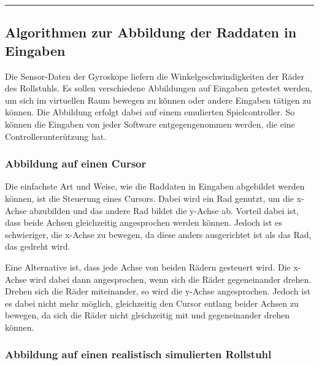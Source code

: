 \begin{center}\rule{0.5\linewidth}{0.5pt}\end{center}

\hypertarget{algorithmen-zur-abbildung-der-raddaten-in-eingaben}{%
\subsection{Algorithmen zur Abbildung der Raddaten in
Eingaben}\label{algorithmen-zur-abbildung-der-raddaten-in-eingaben}}

Die Sensor-Daten der Gyroskope liefern die Winkelgeschwindigkeiten der
Räder des Rollstuhls. Es sollen verschiedene Abbildungen auf Eingaben
getestet werden, um sich im virtuellen Raum bewegen zu können oder
andere Eingaben tätigen zu können. Die Abbildung erfolgt dabei auf einem
emulierten Spielcontroller. So können die Eingaben von jeder Software
entgegengenommen werden, die eine Controllerunterützung hat.

\hypertarget{abbildung-auf-einen-cursor}{%
\subsubsection{Abbildung auf einen
Cursor}\label{abbildung-auf-einen-cursor}}

Die einfachste Art und Weise, wie die Raddaten in Eingaben abgebildet
werden können, ist die Steuerung eines Cursors. Dabei wird ein Rad
genutzt, um die x-Achse abzubilden und das andere Rad bildet die y-Achse
ab. Vorteil dabei ist, dass beide Achsen gleichzeitig angesprochen
werden können. Jedoch ist es schwieriger, die x-Achse zu bewegen, da
diese anders ausgerichtet ist als das Rad, das gedreht wird.

Eine Alternative ist, dass jede Achse von beiden Rädern gesteuert wird.
Die x-Achse wird dabei dann angesprochen, wenn sich die Räder
gegeneinander drehen. Drehen sich die Räder miteinander, so wird die
y-Achse angesprochen. Jedoch ist es dabei nicht mehr möglich,
gleichzeitig den Cursor entlang beider Achsen zu bewegen, da sich die
Räder nicht gleichzeitig mit und gegeneinander drehen können.

\hypertarget{abbildung-auf-einen-realistisch-simulierten-rollstuhl}{%
\subsubsection{Abbildung auf einen realistisch simulierten
Rollstuhl}\label{abbildung-auf-einen-realistisch-simulierten-rollstuhl}}

